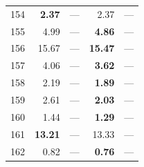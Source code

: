 \begin{longtable}{lr@{\hskip 4pt}l@{\hskip 12pt}r@{\hskip 4pt}l@{\hskip 12pt}}
154 & \textbf{2.37} & --- & 2.37 & --- \\
155 & 4.99 & --- & \textbf{4.86} & --- \\
156 & 15.67 & --- & \textbf{15.47} & --- \\
157 & 4.06 & --- & \textbf{3.62} & --- \\
158 & 2.19 & --- & \textbf{1.89} & --- \\
159 & 2.61 & --- & \textbf{2.03} & --- \\
160 & 1.44 & --- & \textbf{1.29} & --- \\
161 & \textbf{13.21} & --- & 13.33 & --- \\
162 & 0.82 & --- & \textbf{0.76} & --- \\
\bottomrule
\end{longtable}